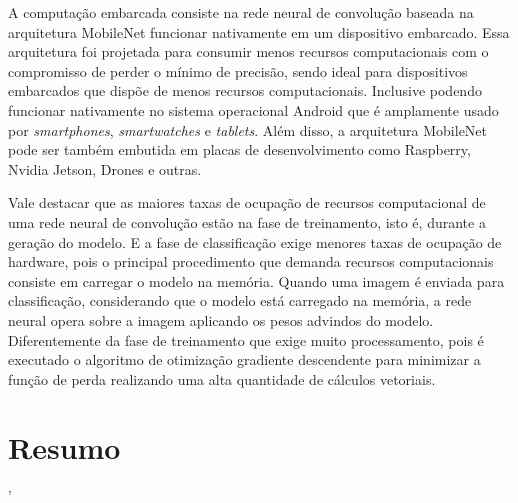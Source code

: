 A computação embarcada consiste na rede neural de convolução baseada na arquitetura MobileNet funcionar nativamente em um dispositivo embarcado. Essa arquitetura foi projetada para consumir menos recursos computacionais com o compromisso de perder o mínimo de precisão, sendo ideal para dispositivos embarcados que dispõe de menos recursos computacionais. Inclusive podendo funcionar nativamente no sistema operacional Android que é amplamente usado por \textit{smartphones}, \textit{smartwatches} e \textit{tablets}. Além disso, a arquitetura MobileNet pode ser também embutida em placas de desenvolvimento como Raspberry, Nvidia Jetson, Drones e outras.  

Vale destacar que as maiores taxas de ocupação de recursos computacional de uma rede neural de convolução estão na fase de treinamento, isto é, durante a geração do modelo. E a fase de classificação exige menores taxas de ocupação de hardware, pois o principal procedimento que demanda recursos computacionais consiste em carregar o modelo na memória. Quando uma imagem é enviada para classificação, considerando que o modelo está carregado na memória, a rede neural opera sobre a imagem aplicando os pesos advindos do modelo. Diferentemente da fase de treinamento que exige muito processamento, pois é executado o algoritmo de otimização gradiente descendente para minimizar a função de perda realizando uma alta quantidade de cálculos vetoriais.   
     

\section{Resumo}\label{sec:considfi}
'%